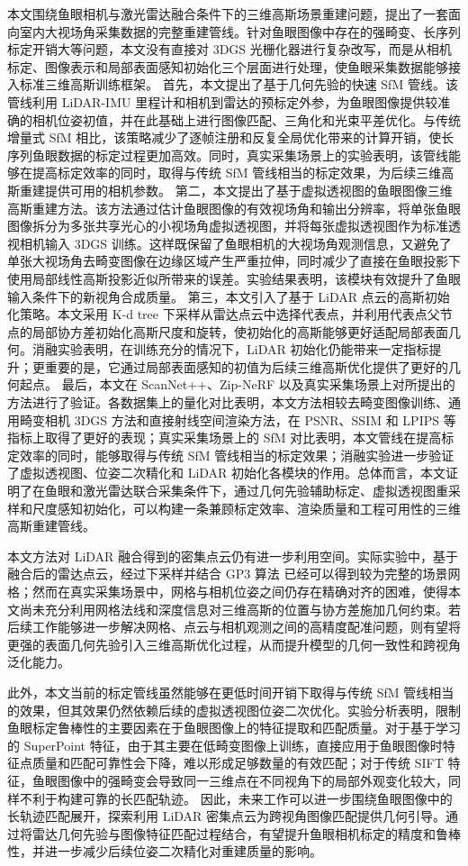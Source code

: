 本文围绕鱼眼相机与激光雷达融合条件下的三维高斯场景重建问题，提出了一套面向室内大视场角采集数据的完整重建管线。针对鱼眼图像中存在的强畸变、长序列标定开销大等问题，本文没有直接对 3DGS 光栅化器进行复杂改写，而是从相机标定、图像表示和局部表面感知初始化三个层面进行处理，使鱼眼采集数据能够接入标准三维高斯训练框架。
首先，本文提出了基于几何先验的快速 SfM 管线。该管线利用 LiDAR-IMU 里程计和相机到雷达的预标定外参，为鱼眼图像提供较准确的相机位姿初值，并在此基础上进行图像匹配、三角化和光束平差优化。与传统增量式 SfM 相比，该策略减少了逐帧注册和反复全局优化带来的计算开销，使长序列鱼眼数据的标定过程更加高效。同时，真实采集场景上的实验表明，该管线能够在提高标定效率的同时，取得与传统 SfM 管线相当的标定效果，为后续三维高斯重建提供可用的相机参数。
第二，本文提出了基于虚拟透视图的鱼眼图像三维高斯重建方法。该方法通过估计鱼眼图像的有效视场角和输出分辨率，将单张鱼眼图像拆分为多张共享光心的小视场角虚拟透视图，并将每张虚拟透视图作为标准透视相机输入 3DGS 训练。这样既保留了鱼眼相机的大视场角观测信息，又避免了单张大视场角去畸变图像在边缘区域产生严重拉伸，同时减少了直接在鱼眼投影下使用局部线性高斯投影近似所带来的误差。实验结果表明，该模块有效提升了鱼眼输入条件下的新视角合成质量。
第三，本文引入了基于 LiDAR 点云的高斯初始化策略。本文采用 K-d tree 下采样从雷达点云中选择代表点，并利用代表点父节点的局部协方差初始化高斯尺度和旋转，使初始化的高斯能够更好适配局部表面几何。消融实验表明，在训练充分的情况下，LiDAR 初始化仍能带来一定指标提升；更重要的是，它通过局部表面感知的初值为后续三维高斯优化提供了更好的几何起点。
最后，本文在 ScanNet++、Zip-NeRF 以及真实采集场景上对所提出的方法进行了验证。各数据集上的量化对比表明，本文方法相较去畸变图像训练、通用畸变相机 3DGS 方法和直接射线空间渲染方法，在 PSNR、SSIM 和 LPIPS 等指标上取得了更好的表现；真实采集场景上的 SfM 对比表明，本文管线在提高标定效率的同时，能够取得与传统 SfM 管线相当的标定效果；消融实验进一步验证了虚拟透视图、位姿二次精化和 LiDAR 初始化各模块的作用。总体而言，本文证明了在鱼眼和激光雷达联合采集条件下，通过几何先验辅助标定、虚拟透视图重采样和尺度感知初始化，可以构建一条兼顾标定效率、渲染质量和工程可用性的三维高斯重建管线。

本文方法对 LiDAR 融合得到的密集点云仍有进一步利用空间。实际实验中，基于融合后的雷达点云，经过下采样并结合 GP3 算法 \cite{marton2009fast} 已经可以得到较为完整的场景网格；然而在真实采集场景中，网格与相机位姿之间仍存在精确对齐的困难，使得本文尚未充分利用网格法线和深度信息对三维高斯的位置与协方差施加几何约束。若后续工作能够进一步解决网格、点云与相机观测之间的高精度配准问题，则有望将更强的表面几何先验引入三维高斯优化过程，从而提升模型的几何一致性和跨视角泛化能力。

此外，本文当前的标定管线虽然能够在更低时间开销下取得与传统 SfM 管线相当的效果，但其效果仍然依赖后续的虚拟透视图位姿二次优化。实验分析表明，限制鱼眼标定鲁棒性的主要因素在于鱼眼图像上的特征提取和匹配质量。对于基于学习的 SuperPoint 特征，由于其主要在低畸变图像上训练，直接应用于鱼眼图像时特征点质量和匹配可靠性会下降，难以形成足够数量的有效匹配；对于传统 SIFT 特征，鱼眼图像中的强畸变会导致同一三维点在不同视角下的局部外观变化较大，同样不利于构建可靠的长匹配轨迹。
因此，未来工作可以进一步围绕鱼眼图像中的长轨迹匹配展开，探索利用 LiDAR 密集点云为跨视角图像匹配提供几何引导。通过将雷达几何先验与图像特征匹配过程结合，有望提升鱼眼相机标定的精度和鲁棒性，并进一步减少后续位姿二次精化对重建质量的影响。
